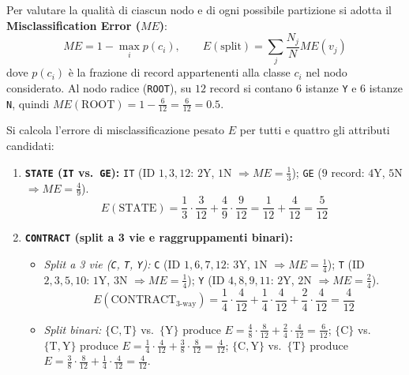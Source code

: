 Per valutare la qualit\`a di ciascun nodo e di ogni possibile partizione si adotta il \textbf{Misclassification Error ($ME$)}:
\begin{equation}
    ME = 1 - \max_{i} p(c_i), \qquad E(\text{split}) = \sum_{j} \frac{N_j}{N} ME(v_j)
\end{equation}
dove $p(c_i)$ \`e la frazione di record appartenenti alla classe $c_i$ nel nodo considerato. Al nodo radice (\texttt{ROOT}), su $12$ record si contano $6$ istanze \texttt{Y} e $6$ istanze \texttt{N}, quindi $ME(\text{ROOT}) = 1 - \frac{6}{12} = \frac{6}{12} = 0.5$.

Si calcola l'errore di misclassificazione pesato $E$ per tutti e quattro gli attributi candidati:
\begin{enumerate}
    \item \textbf{\texttt{STATE} (\texttt{IT} vs.\ \texttt{GE}):} \texttt{IT} (ID $1,3,12$: $2$Y, $1$N $\Rightarrow ME = \frac{1}{3}$); \texttt{GE} ($9$ record: $4$Y, $5$N $\Rightarrow ME = \frac{4}{9}$).
    \begin{equation*}
        E(\text{STATE}) = \frac{1}{3} \cdot \frac{3}{12} + \frac{4}{9} \cdot \frac{9}{12} = \frac{1}{12} + \frac{4}{12} = \frac{5}{12}
    \end{equation*}
    \item \textbf{\texttt{CONTRACT} (split a 3 vie e raggruppamenti binari):}
    \begin{itemize}
        \item \textit{Split a 3 vie (\texttt{C}, \texttt{T}, \texttt{Y}):} \texttt{C} (ID $1,6,7,12$: $3$Y, $1$N $\Rightarrow ME = \frac{1}{4}$); \texttt{T} (ID $2,3,5,10$: $1$Y, $3$N $\Rightarrow ME = \frac{1}{4}$); \texttt{Y} (ID $4,8,9,11$: $2$Y, $2$N $\Rightarrow ME = \frac{2}{4}$).
        \begin{equation*}
            E(\text{CONTRACT}_{\text{3-way}}) = \frac{1}{4}\cdot\frac{4}{12} + \frac{1}{4}\cdot\frac{4}{12} + \frac{2}{4}\cdot\frac{4}{12} = \frac{4}{12}
        \end{equation*}
        \item \textit{Split binari:} $\{\text{C},\text{T}\}$ vs.\ $\{\text{Y}\}$ produce $E = \frac{4}{8}\cdot\frac{8}{12} + \frac{2}{4}\cdot\frac{4}{12} = \frac{6}{12}$; $\{\text{C}\}$ vs.\ $\{\text{T},\text{Y}\}$ produce $E = \frac{1}{4}\cdot\frac{4}{12} + \frac{3}{8}\cdot\frac{8}{12} = \frac{4}{12}$; $\{\text{C},\text{Y}\}$ vs.\ $\{\text{T}\}$ produce $E = \frac{3}{8}\cdot\frac{8}{12} + \frac{1}{4}\cdot\frac{4}{12} = \frac{4}{12}$.
    \end{itemize}

\end{enumerate}
